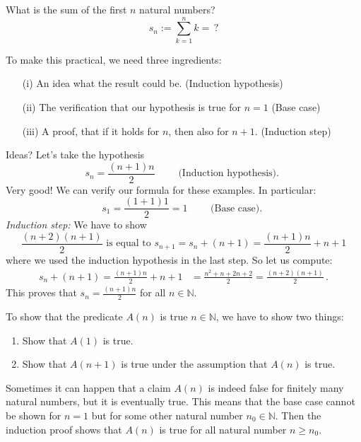 \begin{example}
What is the sum of the first $n$ natural numbers?
\[
 s_n := \sum_{k=1}^n k = \,?
\]

To make this practical, we need three ingredients:
\begin{itemize}
 \item[(i)] An idea what the result could be. (Induction hypothesis)
 \item[(ii)] The verification that our hypothesis is true for $n=1$ (Base case)
 \item[(iii)] A proof, that if it holds for $n$, then also for $n+1$. (Induction step)
\end{itemize}
Ideas? Let's take the hypothesis
\[
 s_n = \frac{(n+1)n}{2}\qquad  \mbox{ (Induction hypothesis). }
\]
Very good! We can verify our formula for these examples. In particular:
\[
 s_1 = \frac{(1+1)1}{2}=1 \qquad  \mbox{ (Base case). }
\]
\emph{Induction step:} We have to show
\[
 \frac{(n+2)(n+1)}{2} \mbox{ is equal to } s_{n+1}=s_n + (n+1)
 = \frac{(n+1)n}{2}+n+1
\]
where we used the induction hypothesis in the last step.
So let us compute:
\begin{align*}
 s_n + (n+1) 
 = \frac{(n+1)n}{2}+n+1&=\frac{n^2+n+2n+2}{2} =
 \frac{(n+2)(n+1)}{2}
 \,.
\end{align*}
This proves that $s_n = \frac{(n+1)n}{2}$ for all $n \in \mathbb{N}$.
\end{example}

\begin{Faust}
 To show that the predicate $A(n)$ is true  $n \in \mathbb{N}$,
 we have to show two things:
 	\begin{enumerate}[(1)]
 		\item Show that $A(1)$ is true.
 		\item Show that $A(n+1)$ is true under the assumption that $A(n)$
 		is true.
 	\end{enumerate}
\end{Faust}

Sometimes it can happen that a claim $A(n)$ is indeed false
for finitely many natural numbers, but it is eventually true. This means
that the base case cannot be shown for $n=1$ but
for some other natural number $n_0 \in \mathbb{N}$. Then the induction proof
shows that $A(n)$ is true for all natural number $n \geq n_0$.
